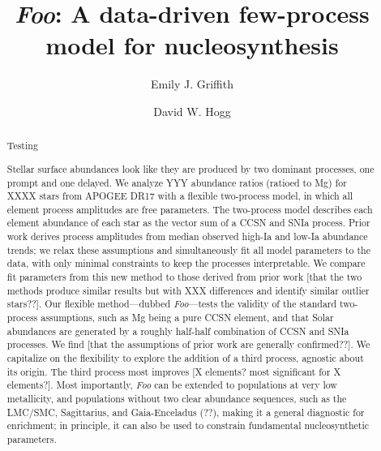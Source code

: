 \documentclass[modern]{aastex631}
\newcommand{\name}{\textsl{Foo}} %
\begin{document}
\title{\name: A data-driven few-process model for nucleosynthesis}


\author[0000-0001-9345-9977]{Emily J. Griffith}

\author[0000-0003-2866-9403]{David W. Hogg}


\begin{abstract}\noindent %
Testing

Stellar surface abundances look like they are produced by two dominant processes, one prompt and one delayed.
We analyze YYY abundance ratios (ratioed to Mg) for XXXX stars from APOGEE DR17 with a flexible two-process model, in which all element process amplitudes are free parameters.
The two-process model describes each element abundance of each star as the vector sum of a CCSN and SNIa process.
Prior work derives process amplitudes from median observed high-Ia and low-Ia abundance trends; we relax these assumptions and simultaneously fit all model parameters to the data, with only minimal constraints to keep the processes interpretable.
We compare fit parameters from this new method to those derived from prior work [that the two methods produce similar results but with XXX differences and identify similar outlier stars??].
Our flexible method---dubbed \name---tests the validity of the standard two-process assumptions, such as Mg being a pure CCSN element, and that Solar abundances are generated by a roughly half-half combination of CCSN and SNIa processes.
We find [that the assumptions of prior work are generally confirmed??].
We capitalize on the flexibility to explore the addition of a third process, agnostic about its origin.
The third process most improves [X elements? most significant for X elements?].
Most importantly, \name{} can be extended to populations at very low metallicity, and populations without two clear abundance sequences, such as the LMC/SMC, Sagittarius, and Gaia-Enceladus (??), making it a general diagnostic for enrichment; in principle, it can also be used to constrain fundamental nucleosynthetic parameters.
\end{abstract}
\end{document}
